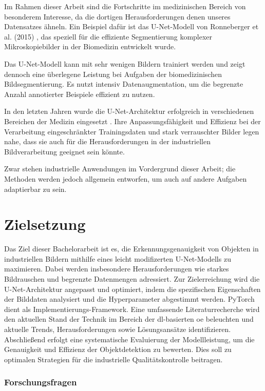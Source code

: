 Im Rahmen dieser Arbeit sind die Fortschritte im medizinischen Bereich von besonderem Interesse, da die dortigen Herausforderungen denen unseres Datensatzes ähneln. Ein Beispiel dafür ist das U-Net-Modell von Ronneberger et al. (2015) \cite{ronneberger_u-net_2015}, das speziell für die effiziente Segmentierung komplexer Mikroskopiebilder in der Biomedizin entwickelt wurde.

Das U-Net-Modell kann mit sehr wenigen Bildern trainiert werden und zeigt dennoch eine überlegene Leistung bei Aufgaben der biomedizinischen Bildsegmentierung. Es nutzt intensiv Datenaugmentation, um die begrenzte Anzahl annotierter Beispiele effizient zu nutzen.

In den letzten Jahren wurde die U-Net-Architektur erfolgreich in verschiedenen Bereichen der Medizin eingesetzt \cite{azad_medical_2024, siddique_u-net_2021}. Ihre Anpassungsfähigkeit und Effizienz bei der Verarbeitung eingeschränkter Trainingsdaten und stark verrauschter Bilder legen nahe, dass sie auch für die Herausforderungen in der industriellen Bildverarbeitung geeignet sein könnte.

Zwar stehen industrielle Anwendungen im Vordergrund dieser Arbeit; die Methoden werden jedoch allgemein entworfen, um auch auf andere Aufgaben adaptierbar zu sein.

\section{Zielsetzung}\label{zielsetzung}

Das Ziel dieser Bachelorarbeit ist es, die Erkennungsgenauigkeit von Objekten in industriellen Bildern mithilfe eines leicht modifizerten U-Net-Modells zu maximieren. Dabei werden insbesondere Herausforderungen wie starkes Bildrauschen und begrenzte Datenmengen adressiert.
Zur Zielerreichung wird die U-Net-Architektur angepasst und optimiert, indem die spezifischen Eigenschaften der Bilddaten analysiert und die Hyperparameter abgestimmt werden. PyTorch dient als Implementierungs-Framework. Eine umfassende Literaturrecherche wird den aktuellen Stand der Technik im Bereich der \gls{dl}-basierten \gls{oe} beleuchten und aktuelle Trends, Herausforderungen sowie Lösungsansätze identifizieren. Abschließend erfolgt eine systematische Evaluierung der Modellleistung, um die Genauigkeit und Effizienz der Objektdetektion zu bewerten. Dies soll zu optimalen Strategien für die industrielle Qualitätskontrolle beitragen.

\subsubsection{Forschungsfragen}

